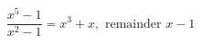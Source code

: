 \documentclass[12pt]{article}
\begin{document}
\sicpsize
\[
\frac{x^5 - 1}{x^2 - 1} = x^3 + x, \text{ remainder } x - 1
\]
\end{document}

